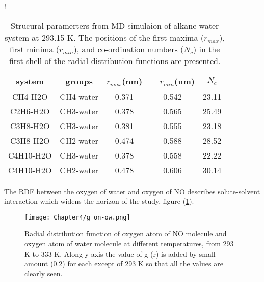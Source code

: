 \begin{table}[H]
\centering
\caption[Strucural paramerters from MD simulaion of alkane-water system.]
{ Strucural paramerters from MD simulaion of alkane-water system at 293.15 K. The positions of the first maxima  ($r_{max}$), first minima ($r_{min}$), and co-ordination  numbers ($N_c$) in the first shell of the radial distribution functions are presented. } 
\label{coordination number}
\resizebox {0.55 \textwidth } {!}{%
\begin{tabular}{|c| c| c|  c| c|} \hline
system & {groups}& $r_{max}$(nm) & ~~$r_{min}$(nm) &  $N_c$
\\ \hline
CH4-H2O & CH4-water & 0.371 &  0.542  & 23.11\\ \hline  
C2H6-H2O & CH3-water & 0.378  & 0.565 & 25.49 \\ \hline 
C3H8-H2O & CH3-water & 0.381  & 0.555 & 23.18\\ \hline 
C3H8-H2O & CH2-water & 0.474  & 0.588 &28.52 \\ \hline
C4H10-H2O &  CH3-water & 0.378  & 0.558 & 22.22 \\ \hline
C4H10-H2O & CH2-water & 0.478  & 0.606 & 30.14 \\ \hline
\end{tabular}} 
\end{table} 

The RDF between the oxygen of water and oxygen of NO describes solute-solvent interaction which widens the horizon of the study, figure (\ref{rdfowon}).

\begin{figure}[h!]
\centering
\texttt{[image: Chapter4/g\_on-ow.png]}
\caption[Radial distribution function  of oxygen atom of NO molecule and oxygen atom of water molecule at different temperatures.]{Radial distribution function  of oxygen atom of NO molecule and oxygen atom of water molecule at different temperatures, from 293 K to 333 K. Along y-axis the value of g (r) is added by small amount (0.2) for each except of 293 K so that all the values are clearly seen.}
\label{rdfowon}
\end{figure}

